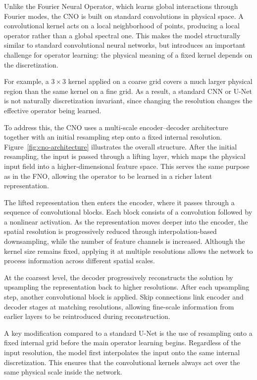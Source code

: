 Unlike the Fourier Neural Operator, which learns global interactions through Fourier modes, the CNO is built on standard convolutions in physical space. A convolutional kernel acts on a local neighborhood of points, producing a local operator rather than a global spectral one. This makes the model structurally similar to standard convolutional neural networks, but introduces an important challenge for operator learning: the physical meaning of a fixed kernel depends on the discretization.

For example, a $3 \times 3$ kernel applied on a coarse grid covers a much larger physical region than the same kernel on a fine grid. As a result, a standard CNN or U-Net is not naturally discretization invariant, since changing the resolution changes the effective operator being learned.

To address this, the CNO uses a multi-scale encoder--decoder architecture together with an initial resampling step onto a fixed internal resolution. Figure~\ref{fig:cno-architecture} illustrates the overall structure. After the initial resampling, the input is passed through a lifting layer, which maps the physical input field into a higher-dimensional feature space. This serves the same purpose as in the FNO, allowing the operator to be learned in a richer latent representation.

The lifted representation then enters the encoder, where it passes through a sequence of convolutional blocks. Each block consists of a convolution followed by a nonlinear activation. As the representation moves deeper into the encoder, the spatial resolution is progressively reduced through interpolation-based downsampling, while the number of feature channels is increased. Although the kernel size remains fixed, applying it at multiple resolutions allows the network to process information across different spatial scales.

At the coarsest level, the decoder progressively reconstructs the solution by upsampling the representation back to higher resolutions. After each upsampling step, another convolutional block is applied. Skip connections link encoder and decoder stages at matching resolutions, allowing fine-scale information from earlier layers to be reintroduced during reconstruction.

A key modification compared to a standard U-Net is the use of resampling onto a fixed internal grid before the main operator learning begins. Regardless of the input resolution, the model first interpolates the input onto the same internal discretization. This ensures that the convolutional kernels always act over the same physical scale inside the network.

